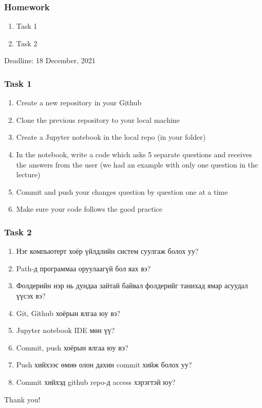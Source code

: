 \documentclass{beamer}
\begin{document}
\begin{frame}
    \frametitle{Homework}
    \begin{enumerate}
        \item Task 1
        \item Task 2
    \end{enumerate}
    Deadline: 18 December, 2021
\end{frame}

\begin{frame}
    \frametitle{Task 1}
    \begin{enumerate}
        \item Create a new repository in your Github
        \item Clone the previous repository to your local machine
        \item Create a Jupyter notebook in the local repo (in your folder)
        \item In the notebook, write a code which asks 5 separate questions and 
        receives the answers from the user (we had an example with only one question
        in the lecture)
        \item Commit and push your changes question by question one at a time
        \item Make sure your code follows the good practice
    \end{enumerate}
\end{frame}

\begin{frame}
    \frametitle{Task 2}
    \begin{enumerate}
        \item Нэг компьютерт хоёр үйлдлийн систем суулгаж болох уу?
        \item Path-д программаа оруулаагүй бол яах вэ?
        \item Фолдерийн нэр нь дундаа зайтай байвал фолдерийг танихад ямар асуудал үүсэх вэ?
        \item Git, Github хоёрын ялгаа юу вэ?
        \item Jupyter notebook IDE мөн үү?
        \item Commit, push хоёрын ялгаа юу вэ?
        \item Push хийхээс өмнө олон дахин commit хийж болох уу?
        \item Commit хийхэд github repo-д access хэрэгтэй юу?
    \end{enumerate}
\end{frame}

\begin{frame}
\Huge{\centerline{Thank you!}}
\end{frame}

\end{document}
